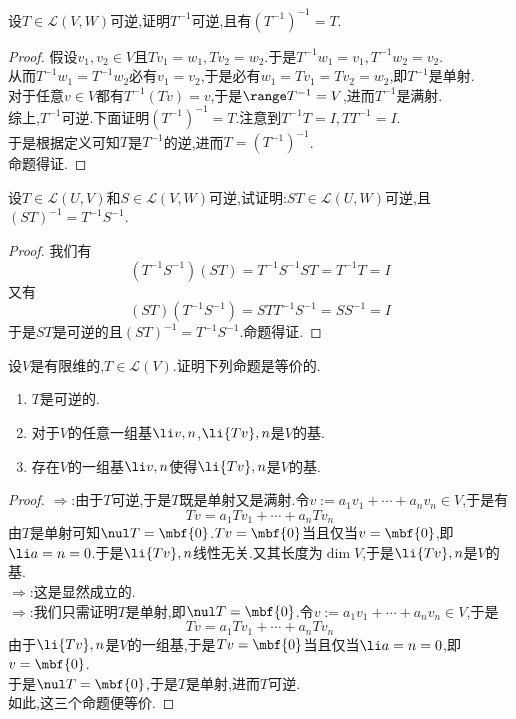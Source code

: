 \documentclass{ctexart}
\begin{document}
\pagestyle{empty}
\begin{center}
    \large{}
\end{center}
\begin{problem}[1.]
    设$T\in\mathcal{L}(V,W)$可逆,证明$T^{-1}$可逆,且有$\left(T^{-1}\right)^{-1}=T$.
\end{problem}
\begin{proof}
    假设$v_1,v_2\in V$且$Tv_1=w_1,Tv_2=w_2$.于是$T^{-1}w_1=v_1,T^{-1}w_2=v_2$.\\
    从而$T^{-1}w_1=T^{-1}w_2$必有$v_1=v_2$,于是必有$w_1=Tv_1=Tv_2=w_2$,即$T^{-1}$是单射.\\
    对于任意$v\in V$都有$T^{-1}(Tv)=v$,于是$\range T^{-1}=V$,进而$T^{-1}$是满射.\\
    综上,$T^{-1}$可逆.下面证明$\left(T^{-1}\right)^{-1}=T$.注意到$T^{-1}T=I,TT^{-1}=I$.\\
    于是根据定义可知$T$是$T^{-1}$的逆,进而$T=\left(T^{-1}\right)^{-1}$.\\
    命题得证.
\end{proof}
\begin{problem}[2.]
    设$T\in\mathcal{L}(U,V)$和$S\in\mathcal{L}(V,W)$可逆,试证明:$ST\in\mathcal{L}(U,W)$可逆,且$(ST)^{-1}=T^{-1}S^{-1}$.
\end{problem}
\begin{proof}
    我们有$$(T^{-1}S^{-1})(ST)=T^{-1}S^{-1}ST=T^{-1}T=I$$
    又有$$(ST)(T^{-1}S^{-1})=STT^{-1}S^{-1}=SS^{-1}=I$$
    于是$ST$是可逆的且$(ST)^{-1}=T^{-1}S^{-1}$.命题得证.
\end{proof}
\begin{problem}[3.]
    设$V$是有限维的,$T\in\mathcal{L}(V)$.证明下列命题是等价的.
    \begin{enumerate}[label=\tbf{(\arabic*)}]
        \item $T$是可逆的.
        \item 对于$V$的任意一组基$\li v,n$,$\li {Tv},n$是$V$的基.
        \item 存在$V$的一组基$\li v,n$使得$\li {Tv},n$是$V$的基.
    \end{enumerate}
\end{problem}
\begin{proof}
    $\Rightarrow$:由于$T$可逆,于是$T$既是单射又是满射.令$v:=a_1v_1+\cdots+a_nv_n\in V$,于是有
    $$Tv=a_1Tv_1+\cdots+a_nTv_n$$
    由$T$是单射可知$\nul T=\mbf{0}$.$Tv=\mbf{0}$当且仅当$v=\mbf{0}$,即$\li a=n=0$.于是$\li {Tv},n$线性无关.又其长度为$\dim V$,于是$\li {Tv},n$是$V$的基.\\
    $\Rightarrow$:这是显然成立的.\\
    $\Rightarrow$:我们只需证明$T$是单射,即$\nul T=\mbf{0}$.令$v:=a_1v_1+\cdots+a_nv_n\in V$,于是
    $$Tv=a_1Tv_1+\cdots+a_nTv_n$$
    由于$\li {Tv},n$是$V$的一组基,于是$Tv=\mbf{0}$当且仅当$\li a=n=0$,即$v=\mbf{0}$.\\
    于是$\nul T=\mbf{0}$,于是$T$是单射,进而$T$可逆.\\
    如此,这三个命题便等价.
\end{proof}
\end{document}

